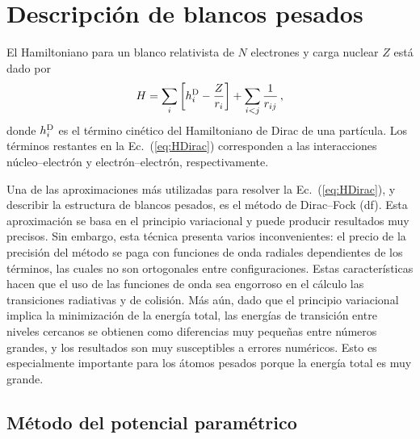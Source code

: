 \section{Descripción de blancos pesados}
\label{sec:method-target}

El Hamiltoniano para un blanco relativista de $N$ electrones y carga 
nuclear $Z$ está dado por
\begin{equation}
H = \sum_i \left[ h_i^{\mbox{\scriptsize D}} - \frac{Z}{r_i}\right]
+ \sum_{i<j}\frac{1}{r_{ij}}\,,
\label{eq:HDirac}
\end{equation}
donde $h_i^{\mbox{\scriptsize D}}$ es el término cinético del 
Hamiltoniano de Dirac de una partícula. Los términos restantes en la
Ec.~(\ref{eq:HDirac}) corresponden a las interacciones 
núcleo--electrón y electrón--electrón, respectivamente. 

Una de las aproximaciones más utilizadas para resolver la 
Ec.~(\ref{eq:HDirac}), y describir la estructura de blancos pesados, es 
el método de Dirac--Fock (\acs{df}). Esta aproximación se basa en el 
principio variacional y puede producir resultados muy precisos. Sin 
embargo, esta técnica presenta varios inconvenientes: el precio de la 
precisión del método se paga con funciones de onda radiales dependientes 
de los términos, las cuales no son ortogonales entre configuraciones. 
Estas características hacen que el uso de las funciones de onda sea 
engorroso en el cálculo las transiciones radiativas y de colisión. Más 
aún, dado que el principio variacional implica la minimización de la 
energía total, las energías de transición entre niveles cercanos se 
obtienen como diferencias muy pequeñas entre números grandes, y los 
resultados son muy susceptibles a errores numéricos. Esto es 
especialmente importante para los átomos pesados porque la energía total 
es muy grande. 

\subsection{Método del potencial paramétrico}


